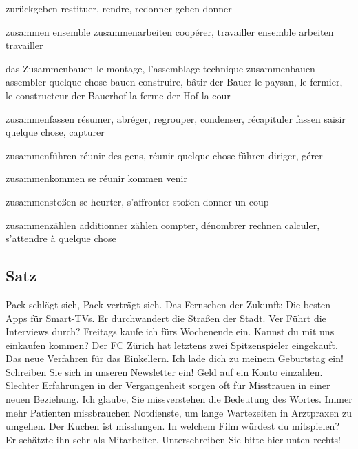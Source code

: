 zurückgeben                      restituer, rendre, redonner
geben                            donner

zusammen                         ensemble
zusammenarbeiten                 coopérer, travailler ensemble
arbeiten                         travailler

das Zusammenbauen                le montage, l'assemblage technique
zusammenbauen                    assembler quelque chose
bauen                            construire, bâtir
der Bauer                        le paysan, le fermier, le constructeur
der Bauerhof                     la ferme
der Hof                          la cour

zusammenfassen                   résumer, abréger, regrouper, condenser, récapituler
fassen                           saisir quelque chose, capturer

zusammenführen                   réunir des gens, réunir quelque chose
führen                           diriger, gérer

zusammenkommen                   se réunir
kommen                           venir

zusammenstoßen                   se heurter, s'affronter
stoßen                           donner un coup

zusammenzählen                   additionner
zählen                           compter, dénombrer
rechnen                          calculer, s'attendre à quelque chose

\subsection{Satz}
Pack schlägt sich, Pack verträgt sich.
Das Fernsehen der Zukunft: Die besten Apps für Smart-TVs.
Er durchwandert die Straßen der Stadt.
Ver Führt die Interviews durch?
Freitags kaufe ich fürs Wochenende ein.
Kannst du mit uns einkaufen kommen?
Der FC Zürich hat letztens zwei Spitzenspieler eingekauft.
Das neue Verfahren für das Einkellern.
Ich lade dich zu meinem Geburtstag ein!
Schreiben Sie sich in unseren Newsletter ein!
Geld auf ein Konto einzahlen.
Slechter Erfahrungen in der Vergangenheit sorgen oft für Misstrauen in einer neuen Beziehung.
Ich glaube, Sie missverstehen die Bedeutung des Wortes.
Immer mehr Patienten missbrauchen Notdienste, um lange Wartezeiten in Arztpraxen zu umgehen.
Der Kuchen ist misslungen.
In welchem Film würdest du mitspielen?
Er schätzte ihn sehr als Mitarbeiter.
Unterschreiben Sie bitte hier unten rechts!
